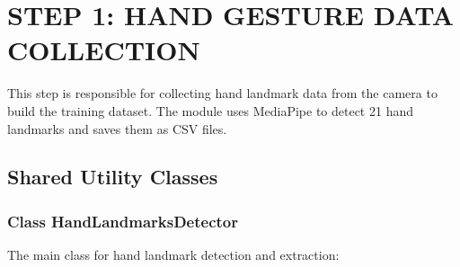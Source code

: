 
\section{STEP 1: HAND GESTURE DATA COLLECTION}

This step is responsible for collecting hand landmark data from the camera to build the training dataset. The module uses MediaPipe to detect 21 hand landmarks and saves them as CSV files.

\subsection{Shared Utility Classes}

\subsubsection{Class HandLandmarksDetector}

The main class for hand landmark detection and extraction:

